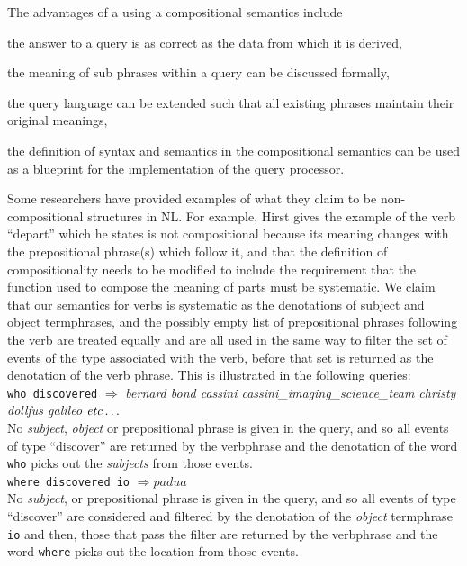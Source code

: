 \documentclass[../main.tex]{subfiles}
\begin{document}
\begin{refsection}
The advantages of a using a compositional semantics include
\begin{inparaenum}[1)]
	\item the answer to a query is as correct as the data from which it is derived,
	\item  the meaning of sub phrases within a query can be discussed formally,
	\item the query language can be extended such that all existing phrases maintain their original meanings,
	\item the definition of syntax and semantics in the compositional semantics can be used as a blueprint for the implementation of the query processor.
\end{inparaenum}

Some researchers have provided examples of what they claim to be non-compositional structures in NL. For example, Hirst \cite{hirst1992semantic} gives the example of the verb ``depart'' which he states is not compositional because its meaning changes with the prepositional phrase(s) which follow it, and that the definition of compositionality needs to be modified to include the requirement that the function used to compose the meaning of parts must be systematic. We claim that our semantics for verbs is systematic as the denotations of subject and object termphrases, and the possibly empty list of prepositional phrases following the verb are treated equally and are all used in the same way to filter the set of events of the type associated with the verb, before that set is returned as the denotation of the verb phrase. This is illustrated in the following queries: \\

\noindent \texttt{who discovered} $\Rightarrow$ \textit{bernard bond cassini cassini\_imaging\_science\_team christy dollfus galileo} $\mathit{etc}\ldots$ \\

No \textit{subject}, \textit{object} or prepositional phrase is given in the query, and so all events of type ``discover'' are returned by the verbphrase and the denotation of the word \texttt{who} picks out the \textit{subjects} from those events. \\

\noindent \texttt{where discovered io} $\Rightarrow \mathit{padua}$ \\

No \textit{subject}, or prepositional phrase is given in the query, and so all events of type ``discover'' are considered and filtered by the denotation of the \textit{object} termphrase \texttt{io} and then, those that pass the filter are returned by the verbphrase and the word \texttt{where} picks out the location from those events. %


\end{refsection}
\end{document}
